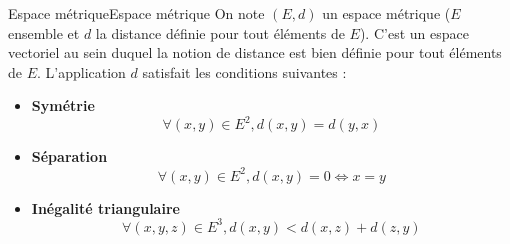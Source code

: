 \begin{definition}{Espace métrique}{Espace métrique}
    On note $(E,d)$ un espace métrique ($E$ ensemble et $d$ la distance définie pour tout éléments de $E$). C'est un espace vectoriel au sein duquel la notion de distance est bien définie pour tout éléments de $E$. L'application $d$ satisfait les conditions suivantes :
    \begin{itemize}
        \item \textbf{Symétrie}
        \begin{equation}
            \forall (x,y) \in E^{2}, d(x,y) = d(y,x)
        \end{equation} 
        \item \textbf{Séparation}
        \begin{equation}
            \forall (x,y) \in E^{2}, d(x,y) = 0 \Longleftrightarrow x = y
        \end{equation} 
        \item \textbf{Inégalité triangulaire}
        \begin{equation}
            \forall (x,y,z) \in E^{3}, d(x,y) < d(x,z) + d(z,y)
        \end{equation} 
    \end{itemize}
\end{definition}
\newpage
